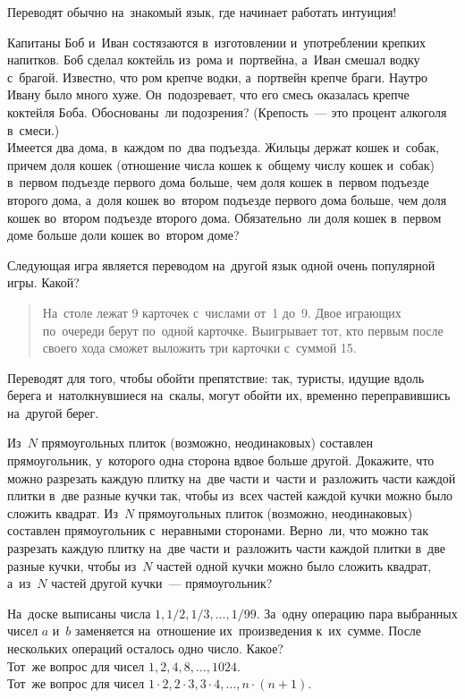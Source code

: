 Переводят обычно на~знакомый язык, где начинает работать интуиция!

\begin{problems}

\item
\subproblem
Капитаны Боб и~Иван состязаются в~изготовлении и~употреблении крепких напитков.
Боб сделал коктейль из~рома и~портвейна, а~Иван смешал водку с~брагой.
Известно, что ром крепче водки, а~портвейн крепче браги.
Наутро Ивану было много хуже.
Он~подозревает, что его смесь оказалась крепче коктейля Боба.
Обоснованы~ли подозрения?
(Крепость~--- это процент алкоголя в~смеси.)
\\
\subproblem
Имеется два дома, в~каждом по~два подъезда.
Жильцы держат кошек и~собак, причем доля кошек (отношение числа кошек к~общему
числу кошек и~собак) в~первом подъезде первого дома больше, чем доля кошек
в~первом подъезде второго дома, а~доля кошек во~втором подъезде первого дома
больше, чем доля кошек во~втором подъезде второго дома.
Обязательно~ли доля кошек в~первом доме больше доли кошек во~втором доме?

\item
Следующая игра является переводом на~другой язык одной очень популярной игры.
Какой?
\begin{quote}
На~столе лежат 9 карточек с~числами от~1 до~9.
Двое играющих по~очереди берут по~одной карточке.
Выигрывает тот, кто первым после своего хода сможет выложить три карточки
с~суммой 15.
\end{quote}

\end{problems}

Переводят для того, чтобы обойти препятствие: так, туристы, идущие вдоль берега
и~натолкнувшиеся на~скалы, могут обойти их, временно переправившись на~другой
берег.

\begin{problems}

\item
\subproblem
Из~$N$ прямоугольных плиток (возможно, неодинаковых) составлен прямоугольник,
у~которого одна сторона вдвое больше другой.
Докажите, что можно разрезать каждую плитку на~две части и~части и~разложить
части каждой плитки в~две разные кучки так, чтобы из~всех частей каждой кучки
можно было сложить квадрат.
\subproblem
Из~$N$ прямоугольных плиток (возможно, неодинаковых) составлен прямоугольник
с~неравными сторонами.
Верно~ли, что можно так разрезать каждую плитку на~две части и~разложить части
каждой плитки в~две разные кучки, чтобы из~$N$ частей одной кучки можно было
сложить квадрат, а~из~$N$ частей другой кучки~--- прямоугольник?

\item
\subproblem
На~доске выписаны числа $1, 1/2, 1/3, \ldots, 1/99$.
За~одну операцию пара выбранных чисел $a$ и~$b$ заменяется на~отношение
их~произведения к~их~сумме.
После нескольких операций осталось одно число.
Какое?
\\
\subproblem
Тот~же вопрос для чисел $1, 2, 4, 8, \ldots, 1024$.
\\
\subproblem
Тот~же вопрос для чисел
$1 \cdot 2, 2 \cdot 3, 3 \cdot 4, \ldots, n \cdot (n + 1)$.

\end{problems}

